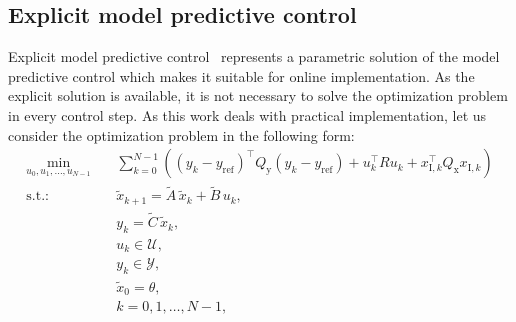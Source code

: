 \documentclass[preprint,12pt]{elsarticle}
\begin{document}
\subsection{Explicit model predictive control}
\label{sec:eMPC}
Explicit model predictive control~\cite{Bemporad_automatica} represents a parametric solution of the model predictive control which makes it suitable for online implementation. As the explicit solution is available, it is not necessary to solve the optimization problem in every control step. As this work deals with practical implementation, let us consider the optimization problem in the following form:
\begin{subequations}
	\label{eq:mpc_problem}
	\begin{eqnarray}
		\label{eq:mpc_problem_cost}
		\min_{u_0,u_{1},\ldots,u_{N-1}} &~& \! \sum_{k=0}^{N-1} \! \left( (y_k-y_\mathrm{ref})^{\intercal} Q_\mathrm{y} (y_k-y_\mathrm{ref}) + u_{k}^{\intercal} R u_{k} + x_{\mathrm{I},k}^{\intercal} Q_\mathrm{x} x_{\mathrm{I},k} \right)  \\
		\label{eq:mpc_problem_prediction_model_x}
		\mathrm{s.t.\!:} &~& \widetilde{x}_{k+1} = \widetilde{A}\,\widetilde{x}_{k} + \widetilde{B}\,u_{k}, \\
		\label{eq:mpc_problem_prediction_model_y}
		&~& y_{k} = \widetilde{C}\,\widetilde{x}_{k}, \\
		\label{eq:mpc_problem_input_constraints}
		&~& u_{k} \in \mathcal{U}, \\
		\label{eq:mpc_problem_state_constraints}
		&~& y_{k} \in \mathcal{Y}, \\
		\label{eq:mpc_problem_initial_coindition}
		&~& \widetilde{x}_{0} = \theta, \\
		\label{eq:mpc_problem_k_range}
		&~& k = 0,1,\ldots, N-1,
	\end{eqnarray}
\end{subequations}
\end{document}

